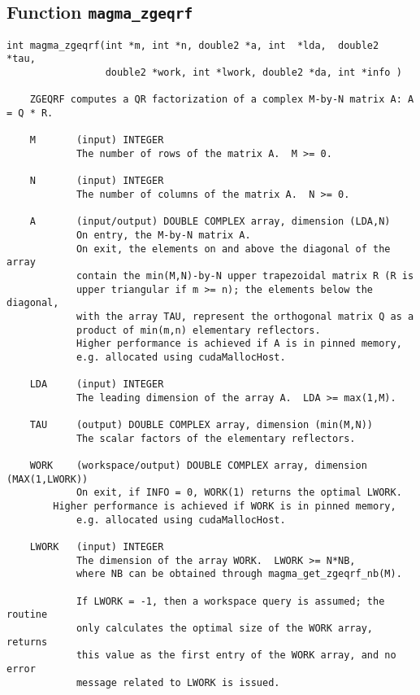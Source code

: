 \documentclass[10pt]{book}
\begin{document}
\newpage
\subsection{Function {\tt {\bf magma\_zgeqrf}}}
\begin{verbatim}
int magma_zgeqrf(int *m, int *n, double2 *a, int  *lda,  double2  *tau,
                 double2 *work, int *lwork, double2 *da, int *info )
   
    ZGEQRF computes a QR factorization of a complex M-by-N matrix A: A = Q * R.   

    M       (input) INTEGER   
            The number of rows of the matrix A.  M >= 0.   

    N       (input) INTEGER   
            The number of columns of the matrix A.  N >= 0.   

    A       (input/output) DOUBLE COMPLEX array, dimension (LDA,N)   
            On entry, the M-by-N matrix A.   
            On exit, the elements on and above the diagonal of the array   
            contain the min(M,N)-by-N upper trapezoidal matrix R (R is   
            upper triangular if m >= n); the elements below the diagonal,   
            with the array TAU, represent the orthogonal matrix Q as a   
            product of min(m,n) elementary reflectors.   
            Higher performance is achieved if A is in pinned memory, 
            e.g. allocated using cudaMallocHost.

    LDA     (input) INTEGER   
            The leading dimension of the array A.  LDA >= max(1,M).   

    TAU     (output) DOUBLE COMPLEX array, dimension (min(M,N))   
            The scalar factors of the elementary reflectors.   

    WORK    (workspace/output) DOUBLE COMPLEX array, dimension (MAX(1,LWORK))   
            On exit, if INFO = 0, WORK(1) returns the optimal LWORK.   
	    Higher performance is achieved if WORK is in pinned memory, 
            e.g. allocated using cudaMallocHost.

    LWORK   (input) INTEGER   
            The dimension of the array WORK.  LWORK >= N*NB, 
            where NB can be obtained through magma_get_zgeqrf_nb(M).   

            If LWORK = -1, then a workspace query is assumed; the routine   
            only calculates the optimal size of the WORK array, returns   
            this value as the first entry of the WORK array, and no error   
            message related to LWORK is issued.


\end{verbatim}
\end{document}
